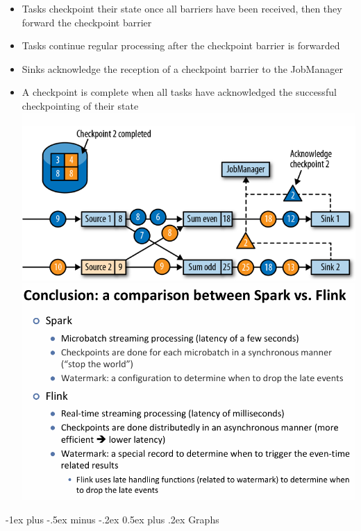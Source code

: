 \documentclass[10pt, landscape]{article}
\makeatletter
\renewcommand{\section}{\@startsection{section}{1}{0mm}%
  {-1ex plus -.5ex minus -.2ex}%
  {0.5ex plus .2ex}%
{\normalfont\large\bfseries}}
\makeatother
\begin{document}
\begin{multicols*}{4}
\begin{itemize}
\begin{itemize}
\begin{itemize}
                \item Tasks checkpoint their state once all barriers have been received, then they forward the checkpoint barrier
                \item Tasks continue regular processing after the checkpoint barrier is forwarded
                \item Sinks acknowledge the reception of a checkpoint barrier to the JobManager
                \item A checkpoint is complete when all tasks have acknowledged the successful checkpointing of their state
                \includegraphics[width=0.95\linewidth]{flink_checkpoint_end_acknowledgement.png}
                \includegraphics[width=0.95\linewidth]{flink_vs_spark.png}
              \end{itemize}
        \end{itemize}
\end{itemize}

\section{Graphs}


\end{multicols*}
\end{document}

